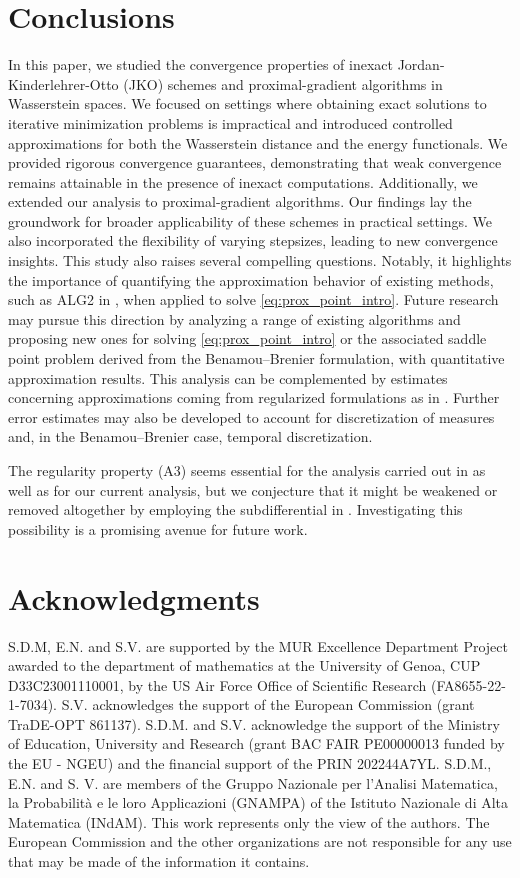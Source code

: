 \documentclass[11pt]{article}
\numberwithin{equation}{section}
\begin{document}
\section*{Conclusions}

In this paper, we studied the convergence properties of inexact Jordan-Kinderlehrer-Otto (JKO) schemes and proximal-gradient algorithms in Wasserstein spaces. We focused on settings where obtaining exact solutions to iterative minimization problems is impractical and introduced controlled approximations for both the Wasserstein distance and the energy functionals.
We provided rigorous convergence guarantees, demonstrating that weak convergence remains attainable in the presence of inexact computations. Additionally, we extended our analysis to proximal-gradient algorithms. Our findings lay the groundwork for broader applicability of these schemes in practical settings.  We also incorporated the flexibility of varying stepsizes, leading to new convergence insights. This study also raises several compelling questions. Notably, it highlights the importance of quantifying the approximation behavior of existing methods, such as ALG2 in \cite{BCL16}, when applied to solve \eqref{eq:prox_point_intro}. Future research may pursue this direction by analyzing a range of existing algorithms and proposing new ones for solving \eqref{eq:prox_point_intro} or the associated saddle point problem derived from the Benamou–Brenier formulation, with quantitative approximation results. This analysis can be complemented by estimates concerning approximations coming from regularized formulations as in \cite{CDPS17,LLO23, LLW20, LWL24}. Further error estimates may also be developed to account for discretization of measures and, in the Benamou–Brenier case, temporal discretization.

The regularity property (A3) seems essential for the analysis carried out in \cite{WPG2020} as well as for our current analysis,  but we conjecture that it might be weakened or removed altogether by employing the subdifferential in \cite[Theorem 10.3.6]{AGS08}.  Investigating this possibility is a promising avenue for future work.


\section*{Acknowledgments}

S.D.M, E.N. and S.V. are supported by the MUR Excellence Department Project awarded to the department of mathematics at the University of Genoa, CUP D33C23001110001, by the US Air Force Office of Scientific Research (FA8655-22-1-7034). S.V. acknowledges the support of the European Commission (grant TraDE-OPT 861137). S.D.M. and S.V. acknowledge the support of the Ministry of Education, University and Research (grant BAC FAIR PE00000013 funded by the EU - NGEU) and the financial support of the PRIN 202244A7YL. S.D.M., E.N. and S. V. are members of the Gruppo Nazionale per l’Analisi Matematica, la Probabilità e le loro Applicazioni (GNAMPA) of the Istituto Nazionale di Alta Matematica (INdAM). This work represents only the view of the authors. The European Commission and the other organizations are not responsible for any use that may be made of the information it contains.

 

%
%
%
\end{document}

